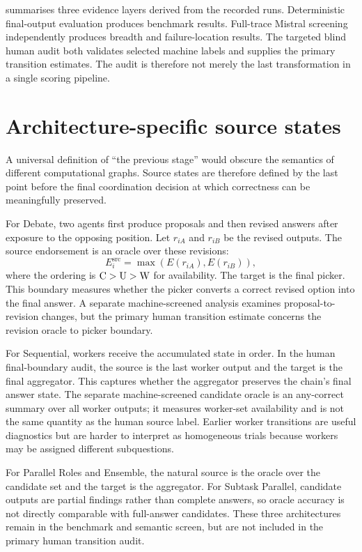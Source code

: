  summarises three evidence layers derived from the recorded runs. Deterministic final-output evaluation produces benchmark results. Full-trace Mistral screening independently produces breadth and failure-location results. The targeted blind human audit both validates selected machine labels and supplies the primary transition estimates. The audit is therefore not merely the last transformation in a single scoring pipeline.

\section{Architecture-specific source states}

A universal definition of ``the previous stage'' would obscure the semantics of different computational graphs. Source states are therefore defined by the last point before the final coordination decision at which correctness can be meaningfully preserved.

For Debate, two agents first produce proposals and then revised answers after exposure to the opposing position. Let $r_{iA}$ and $r_{iB}$ be the revised outputs. The source endorsement is an oracle over these revisions:
\begin{equation}
  E_i^{\mathrm{src}} = \max\left(E(r_{iA}), E(r_{iB})\right),
\end{equation}
where the ordering is $\mathrm{C} > \mathrm{U} > \mathrm{W}$ for availability. The target is the final picker. This boundary measures whether the picker converts a correct revised option into the final answer. A separate machine-screened analysis examines proposal-to-revision changes, but the primary human transition estimate concerns the revision oracle to picker boundary.

For Sequential, workers receive the accumulated state in order. In the human final-boundary audit, the source is the last worker output and the target is the final aggregator. This captures whether the aggregator preserves the chain's final answer state. The separate machine-screened candidate oracle is an any-correct summary over all worker outputs; it measures worker-set availability and is not the same quantity as the human source label. Earlier worker transitions are useful diagnostics but are harder to interpret as homogeneous trials because workers may be assigned different subquestions.

For Parallel Roles and Ensemble, the natural source is the oracle over the candidate set and the target is the aggregator. For Subtask Parallel, candidate outputs are partial findings rather than complete answers, so oracle accuracy is not directly comparable with full-answer candidates. These three architectures remain in the benchmark and semantic screen, but are not included in the primary human transition audit.

